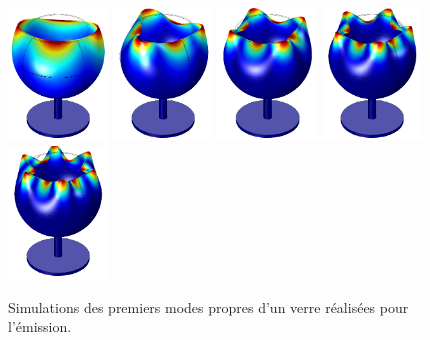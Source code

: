 \documentclass[12pt,a4paper]{article}
\begin{document}
\begin{figure}[b]
\center
\includegraphics[height=100pt]{figures/wine_glass_f0_small.png}
\hfill
\includegraphics[height=100pt]{figures/wine_glass_f1_small.png}
\hfill
\includegraphics[height=100pt]{figures/wine_glass_f2_small.png}
\hfill
\includegraphics[height=100pt]{figures/wine_glass_f3_small.png}
\hfill
\includegraphics[height=100pt]{figures/wine_glass_f4_small.png}
\caption{Simulations des premiers modes propres d'un verre réalisées pour l'émission.}
\label{fig:wine_glass}
\end{figure}
\end{document}
